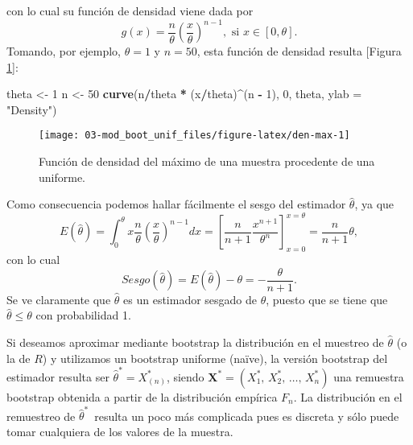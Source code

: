 \documentclass[]{book}
\newenvironment{Shaded}{\begin{snugshade}}{\end{snugshade}}
\newcommand{\KeywordTok}[1]{\textcolor[rgb]{0.13,0.29,0.53}{\textbf{#1}}}
\newcommand{\DataTypeTok}[1]{\textcolor[rgb]{0.13,0.29,0.53}{#1}}
\newcommand{\DecValTok}[1]{\textcolor[rgb]{0.00,0.00,0.81}{#1}}
\newcommand{\StringTok}[1]{\textcolor[rgb]{0.31,0.60,0.02}{#1}}
\newcommand{\OperatorTok}[1]{\textcolor[rgb]{0.81,0.36,0.00}{\textbf{#1}}}
\newcommand{\NormalTok}[1]{#1}
\theoremstyle{break}
\theoremstyle{definition}
\theoremstyle{definition}
\theoremstyle{definition}
\theoremstyle{remark}
\begin{document}
con lo cual su función de densidad viene dada por
\[g\left( x \right) =\frac{n}{\theta }\left( \frac{x}{\theta } \right)^{n-1},
\text{ si }x\in \left[ 0,\theta \right] .\] Tomando, por ejemplo,
\(\theta =1\) y \(n=50\), esta función de densidad resulta {[}Figura
\ref{fig:den-max}{]}:

\begin{Shaded}
\begin{Highlighting}[]
\NormalTok{theta <-}\StringTok{ }\DecValTok{1}
\NormalTok{n <-}\StringTok{ }\DecValTok{50}
\KeywordTok{curve}\NormalTok{(n}\OperatorTok{/}\NormalTok{theta }\OperatorTok{*}\StringTok{ }\NormalTok{(x}\OperatorTok{/}\NormalTok{theta)}\OperatorTok{^}\NormalTok{(n }\OperatorTok{-}\StringTok{ }\DecValTok{1}\NormalTok{), }\DecValTok{0}\NormalTok{, theta, }\DataTypeTok{ylab =} \StringTok{"Density"}\NormalTok{)}
\end{Highlighting}
\end{Shaded}

\begin{figure}[!htb]

{\centering \texttt{[image: 03-mod\_boot\_unif\_files/figure-latex/den-max-1]} 

}

\caption{Función de densidad del máximo de una muestra procedente de una uniforme.}\label{fig:den-max}
\end{figure}

Como consecuencia podemos hallar fácilmente el sesgo del estimador
\(\hat{\theta}\), ya que
\[E\left( \hat{\theta} \right) =\int_{0}^{\theta }x\frac{n}{\theta }\left( 
\frac{x}{\theta } \right)^{n-1}dx=\left[ \frac{n}{n+1}\frac{x^{n+1}}{\theta
^{n}}\right] _{x=0}^{x=\theta }=\frac{n}{n+1}\theta ,\] con lo cual
\[Sesgo\left( \hat{\theta} \right) =E\left( \hat{\theta} \right)
-\theta = -\frac{\theta }{n+1}.\] Se ve claramente que \(\hat{\theta}\)
es un estimador sesgado de \(\theta\), puesto que se tiene que
\(\hat{\theta}\leq \theta\) con probabilidad 1.

Si deseamos aproximar mediante bootstrap la distribución en el muestreo
de \(\hat{\theta}\) (o la de \(R\)) y utilizamos un bootstrap uniforme
(naïve), la versión bootstrap del estimador resulta ser
\(\hat{\theta}^{\ast }=X_{(n)}^{\ast}\), siendo
\(\mathbf{X}^{\ast}=\left( X_1^{\ast}\text{, }X_2^{\ast}\text{, }\ldots \text{, }X_n^{\ast } \right)\)
una remuestra bootstrap obtenida a partir de la distribución empírica
\(F_n\). La distribución en el remuestreo de \(\hat{\theta} ^{\ast}\,\)
resulta un poco más complicada pues es discreta y sólo puede tomar
cualquiera de los valores de la muestra.
\end{document}
